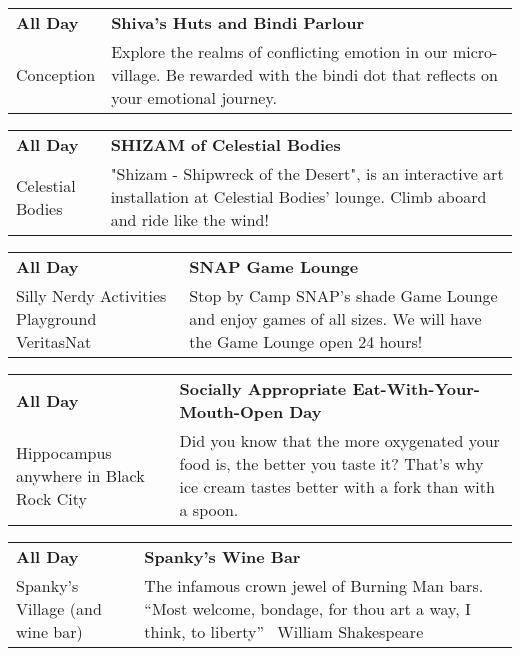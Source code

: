 \begin{tabular}{ p{1in} p{2.2in} }
    \textbf{All Day} & \textbf{Shiva's Huts and Bindi Parlour} \\
    Conception \newline  & Explore the realms of conflicting emotion in our micro-village.  Be rewarded with the bindi dot that reflects on your emotional journey. \\
    \hline 
\end{tabular}
    
\begin{tabular}{ p{1in} p{2.2in} }
    \textbf{All Day} & \textbf{SHIZAM of Celestial Bodies} \\
    Celestial Bodies \newline  & "Shizam - Shipwreck of the Desert", is an interactive art installation at Celestial Bodies' lounge. Climb aboard and ride like the wind! \\
    \hline 
\end{tabular}
    
\begin{tabular}{ p{1in} p{2.2in} }
    \textbf{All Day} & \textbf{SNAP Game Lounge} \\
    Silly Nerdy Activities Playground \newline VeritasNat & Stop by Camp SNAP's shade Game Lounge and enjoy games of all sizes. We will have the Game Lounge open 24 hours! \\
    \hline 
\end{tabular}
    
\begin{tabular}{ p{1in} p{2.2in} }
    \textbf{All Day} & \textbf{Socially Appropriate Eat-With-Your-Mouth-Open Day} \\
    Hippocampus \newline anywhere in Black Rock City & Did you know that the more oxygenated your food is, the better you taste it? That's why ice cream tastes better with a fork than with a spoon. \\
    \hline 
\end{tabular}
    
\begin{tabular}{ p{1in} p{2.2in} }
    \textbf{All Day} & \textbf{Spanky's Wine Bar} \\
    Spanky's Village (and wine bar) \newline  & The infamous crown jewel of Burning Man bars.  ``Most welcome, bondage, for thou art a way, I think, to liberty''  ~William Shakespeare~ \\
    \hline 
\end{tabular}
    
